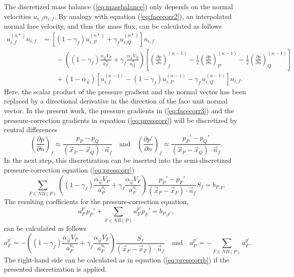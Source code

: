 The discretized mass balance (\ref{eq:massbalance}) only depends on the normal velocities \(u_{i,f} n_{i,f}\). By analogy with equation (\ref{eq:facecorr2}), an interpolated normal face velocity, and thus the mass flux, can be calculated as follows
\begin{align}
  \label{eq:facecorr3}
  u_{i,f}^{(n*)} n_{i,f}
  &=
  \left[\left(1 - \gamma_f\right) u_{i,P}^{(n*)} + \gamma_f u_{i,Q}^{(n*)} \right]n_{i,f} \nonumber\\[1em]
  &\quad\quad - 
  \left(\left(1 - \gamma_f\right) \frac{\alpha_\vec{u} V_P}{a_P^{u_i}} + \gamma_f \frac{\alpha_\vec{u} V_Q}{a_Q^{u_i}}\right)
  \left[ 
  \left(\frac{\partial p}{\partial n}\right)_f^{(n-1)} 
  -  \frac{1}{2} \left( \frac{\partial p}{\partial n} \right)_P^{(n-1)} 
  -  \frac{1}{2} \left(\frac{\partial p}{\partial n}\right)_Q^{(n-1)} 
\right] \nonumber \\[1em]
&\quad\quad + \left(1 - \alpha_\vec{u}\right) \left[ u_{i,f}^{(n-1)} - \left(1 - \gamma_f\right) u_{i,P}^{(n-1)} - \gamma_f \, u_{i,Q}^{(n-1)} \right] n_{i,f}.
\end{align}
Here, the scalar product of the pressure gradient and the normal vector has been replaced by a directional derivative in the direction of the face unit normal vector. In the present work, the pressure gradients in (\ref{eq:facecorr3}) and the pressure-correction gradients in equation (\ref{eq:presscorr}) will be discretized by central differences
\begin{displaymath}
\left(\frac{\partial p}{\partial n}\right)_f \approx \frac{p_P - p_Q}{\left(\vec{x}_P - \vec{x}_Q\right)\cdot \vec{n}_f} 
\quad \text{and} \quad 
\left(\frac{\partial p'}{\partial n}\right)_f \approx \frac{p_P' - p_Q'}{\left(\vec{x}_P - \vec{x}_Q\right)\cdot \vec{n}_f}.
\end{displaymath}
In the next step, this discretization can be inserted into the semi-discretized pressure-correction equation (\ref{eq:presscorr}) 
\begin{displaymath}
  \sum_{F \in NB(P)} \left(\left(1 - \gamma_f\right) \frac{\alpha_\vec{u} V_P}{a_P^{u_i}} + \gamma_f \frac{\alpha_\vec{u} V_F}{a_F^{u_i}}\right)
   \frac{p_P' - p_F'}{\left(\vec{x}_P - \vec{x}_F\right)\cdot \vec{n}_f} S_f
  = b_{P,p}.
\end{displaymath}
The resulting coefficients for the pressure-correction equation,
\begin{displaymath}
  a_P^{p'} p_{P}' + \sum_{F \in NB(P)} a_F^{p'} p_{F}' = b_{P,p'},
\end{displaymath}
can be calculated as follows
\begin{equation}
  \label{eq:segpresscorrcoeff}
  a_F^{p'} = -\left(\left(1 - \gamma_f\right) \frac{\alpha_\vec{u} V_P}{a_P^{u_i}} + \gamma_f \frac{\alpha_\vec{u} V_F}{a_F^{u_i}}\right) \frac{S_f}{\left(\vec{x}_P - \vec{x}_F\right) \cdot \vec{n}_f} \quad \text{and} \quad
  a_P^{p'} = - \sum_{F \in NB(P)} a_F^{p'}.
\end{equation}
The right-hand side can be calculated as in equation (\ref{eq:presscorrb}) if the presented discretization is applied. 

